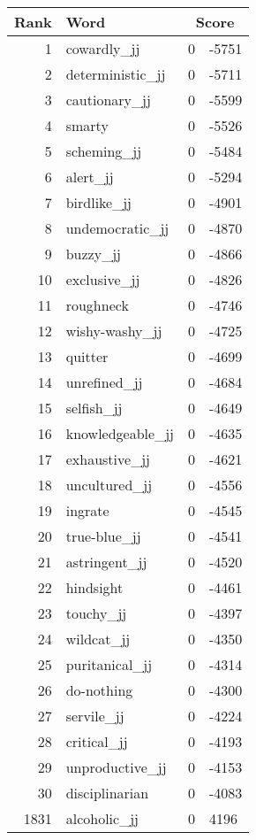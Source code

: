 \begin{longtable}[!htbp]{| rlr@{.}l |}
    \hline
    \textbf{Rank} & \textbf{Word} & \multicolumn{2}{c|}{\textbf{Score}} \\
    \hline
    \endhead
    1 & cowardly\_jj & 0 & -5751 \\
    2 & deterministic\_jj & 0 & -5711 \\
    3 & cautionary\_jj & 0 & -5599 \\
    4 & smarty & 0 & -5526 \\
    5 & scheming\_jj & 0 & -5484 \\
    6 & alert\_jj & 0 & -5294 \\
    7 & birdlike\_jj & 0 & -4901 \\
    8 & undemocratic\_jj & 0 & -4870 \\
    9 & buzzy\_jj & 0 & -4866 \\
    10 & exclusive\_jj & 0 & -4826 \\
    11 & roughneck & 0 & -4746 \\
    12 & wishy-washy\_jj & 0 & -4725 \\
    13 & quitter & 0 & -4699 \\
    14 & unrefined\_jj & 0 & -4684 \\
    15 & selfish\_jj & 0 & -4649 \\
    16 & knowledgeable\_jj & 0 & -4635 \\
    17 & exhaustive\_jj & 0 & -4621 \\
    18 & uncultured\_jj & 0 & -4556 \\
    19 & ingrate & 0 & -4545 \\
    20 & true-blue\_jj & 0 & -4541 \\
    21 & astringent\_jj & 0 & -4520 \\
    22 & hindsight & 0 & -4461 \\
    23 & touchy\_jj & 0 & -4397 \\
    24 & wildcat\_jj & 0 & -4350 \\
    25 & puritanical\_jj & 0 & -4314 \\
    26 & do-nothing & 0 & -4300 \\
    27 & servile\_jj & 0 & -4224 \\
    28 & critical\_jj & 0 & -4193 \\
    29 & unproductive\_jj & 0 & -4153 \\
    30 & disciplinarian & 0 & -4083 \\
    1831 & alcoholic\_jj & 0 & 4196 \\

\end{longtable}
